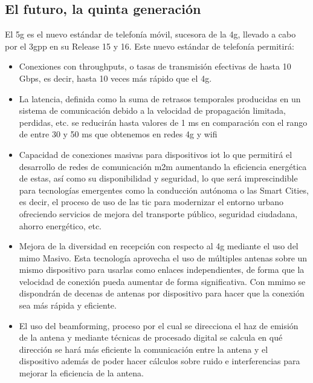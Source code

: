 \subsection{El futuro, la quinta generación}
\par El \gls{5g} es el nuevo estándar de telefonía móvil, sucesora de la \gls{4g}, llevado a cabo por el \gls{3gpp} en su Release 15 y 16. Este nuevo estándar de telefonía permitirá:
\begin{itemize}
\item Conexiones con throughputs, o tasas de transmisión efectivas de hasta 10 Gbps, es decir, hasta 10 veces más rápido que el \gls{4g}.
\item La latencia, definida como la suma de retrasos temporales producidas en un sistema de comunicación debido a la velocidad de propagación limitada, perdidas, etc. se reducirán hasta valores de 1 ms en comparación con el rango de entre 30 y 50 ms que obtenemos en redes \gls{4g} y \gls{wifi}
\item Capacidad de conexiones masivas para dispositivos \gls{iot} lo que permitirá  el desarrollo de redes de comunicación \gls{m2m} aumentando la eficiencia energética de estas, así como su disponibilidad y seguridad, lo que será imprescindible para tecnologías emergentes como la conducción autónoma o las Smart Cities, es decir, el proceso de uso de las \gls{tic} para modernizar el entorno urbano ofreciendo servicios de mejora del transporte público, seguridad ciudadana, ahorro energético, etc.
\item Mejora de la diversidad en recepción con respecto al \gls{4g} mediante el uso del \gls{mimo} Masivo. Esta tecnología aprovecha el uso de múltiples antenas sobre un mismo dispositivo para usarlas como enlaces independientes, de forma que la velocidad de conexión pueda aumentar de forma significativa. Con \gls{mmimo} se dispondrán de decenas de antenas por dispositivo para hacer que la conexión sea más rápida y eficiente.
\item El uso del beamforming, proceso por el cual se direcciona el haz de emisión de la antena y mediante técnicas de procesado digital se calcula en qué dirección se hará más eficiente la comunicación entre la antena y el dispositivo además de poder hacer cálculos sobre ruido e interferencias para mejorar la eficiencia de la antena.
\end{itemize}

